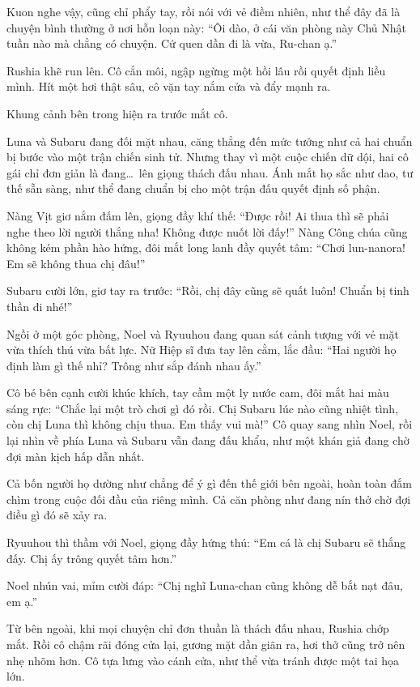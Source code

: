 \documentclass[../main.tex]{subfiles}
\begin{document}
Kuon nghe vậy, cũng chỉ phẩy tay, rồi nói với vẻ điềm nhiên, như thể đây đã là chuyện bình thường ở nơi hỗn loạn này: ``Ôi dào, ở cái văn phòng này Chủ Nhật tuần nào mà chẳng có chuyện. Cứ quen dần đi là vừa, Ru-chan ạ.''

Rushia khẽ run lên. Cô cắn môi, ngập ngừng một hồi lâu rồi quyết định liều mình. Hít một hơi thật sâu, cô vặn tay nắm cửa và đẩy mạnh ra.

Khung cảnh bên trong hiện ra trước mắt cô.

Luna và Subaru đang đối mặt nhau, căng thẳng đến mức tưởng như cả hai chuẩn bị bước vào một trận chiến sinh tử. Nhưng thay vì một cuộc chiến dữ dội, hai cô gái chỉ đơn giản là đang\dots\ lên giọng thách đấu nhau. Ánh mắt họ sắc như dao, tư thế sẵn sàng, như thể đang chuẩn bị cho một trận đấu quyết định số phận.


Nàng Vịt giơ nắm đấm lên, giọng đầy khí thế: ``Được rồi! Ai thua thì sẽ phải nghe theo lời người thắng nha! Không được nuốt lời đấy!'' Nàng Công chúa cũng không kém phần hào hứng, đôi mắt long lanh đầy quyết tâm: ``Chơi lun-nanora! Em sẽ không thua chị đâu!''

Subaru cười lớn, giơ tay ra trước: ``Rồi, chị đây cũng sẽ quất luôn! Chuẩn bị tinh thần đi nhé!''

Ngồi ở một góc phòng, Noel và Ryuuhou đang quan sát cảnh tượng với vẻ mặt vừa thích thú vừa bất lực. Nữ Hiệp sĩ đưa tay lên cằm, lắc đầu: ``Hai người họ định làm gì thế nhỉ? Trông như sắp đánh nhau ấy.''

Cô bé bên cạnh cười khúc khích, tay cầm một ly nước cam, đôi mắt hai màu sáng rực: ``Chắc lại một trò chơi gì đó rồi. Chị Subaru lúc nào cũng nhiệt tình, còn chị Luna thì không chịu thua. Em thấy vui mà!'' Cô quay sang nhìn Noel, rồi lại nhìn về phía Luna và Subaru vẫn đang đấu khẩu, như một khán giả đang chờ đợi màn kịch hấp dẫn nhất.

Cả bốn người họ dường như chẳng để ý gì đến thế giới bên ngoài, hoàn toàn đắm chìm trong cuộc đối đầu của riêng mình. Cả căn phòng như đang nín thở chờ đợi điều gì đó sẽ xảy ra.

Ryuuhou thì thầm với Noel, giọng đầy hứng thú: ``Em cá là chị Subaru sẽ thắng đấy. Chị ấy trông quyết tâm hơn.''

Noel nhún vai, mỉm cười đáp: ``Chị nghĩ Luna-chan cũng không dễ bắt nạt đâu, em ạ.''

Từ bên ngoài, khi mọi chuyện chỉ đơn thuần là thách đấu nhau, Rushia chớp mắt. Rồi cô chậm rãi đóng cửa lại, gương mặt dần giãn ra, hơi thở cũng trở nên nhẹ nhõm hơn. Cô tựa lưng vào cánh cửa, như thể vừa tránh được một tai họa lớn.
\end{document}
